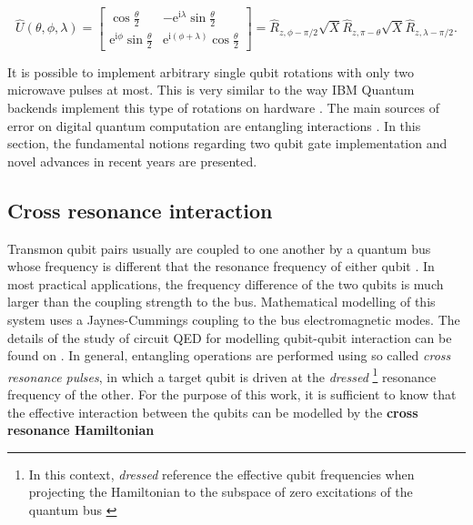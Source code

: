     \begin{equation}
      \hat{U}(\theta, \phi, \lambda) = \begin{bmatrix}
        \cos{\frac{\theta}{2}} & -\mathrm{e}^{\mathrm{i}\lambda}\sin{\frac{\theta}{2}} \\
        \mathrm{e}^{\mathrm{i}\phi}\sin{\frac{\theta}{2}} & \mathrm{e}^{\mathrm{i}(\phi+\lambda)}\cos{\frac{\theta}{2}}
      \end{bmatrix}= \hat{R}_{z, \phi-\pi/2} \sqrt{X} \hat{R}_{z, \pi-\theta} \sqrt{X} \hat{R}_{z, \lambda-\pi/2}. 
      \label{eq:qiskitGateImplement}
    \end{equation}

    It is possible to implement arbitrary single qubit rotations with only two microwave pulses at most. This is very similar to the way IBM Quantum backends implement this type of rotations on hardware \cite{Qiskit}. The main sources of error on digital quantum computation are entangling interactions \cite{HeisenbergSimulLasHeras}. In this section, the fundamental notions regarding two qubit gate implementation and novel advances in recent years are presented.

  \subsection{Cross resonance interaction}
  \label{subsec:CrossResonanceInteraction}

    Transmon qubit pairs usually are coupled to one another by a quantum bus whose frequency is different that the resonance frequency of either qubit \cite{quantumEngineer, 2016RZXCalibration}. In most practical applications, the frequency difference of the two qubits is much larger than the coupling strength to the bus. Mathematical modelling of this system uses a Jaynes-Cummings coupling to the bus electromagnetic modes. The details of the study of circuit QED for modelling qubit-qubit interaction can be found on \cite{2020RZXHamiltonianModels}. In general, entangling operations are performed using so called \textit{cross resonance pulses}, in which a target qubit is driven at the \textit{dressed} \footnote{In this context, \textit{dressed} reference the effective qubit frequencies when projecting the Hamiltonian to the subspace of zero excitations of the quantum bus \cite{2020RZXHamiltonianModels}} resonance frequency of the other. For the purpose of this work, it is sufficient to know that the effective interaction between the qubits can be modelled by the \textbf{cross resonance Hamiltonian} \cite{DuplicatedRXZPulse, 2016RZXCalibration}

